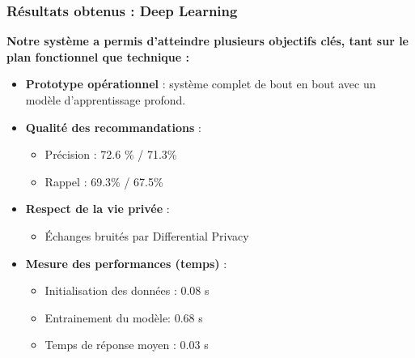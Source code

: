 \documentclass{beamer}
\begin{document}
\begin{frame}
    \frametitle{Résultats obtenus : Deep Learning}
    \scriptsize
    \textbf{Notre système a permis d’atteindre plusieurs objectifs clés, tant sur le plan fonctionnel que technique :}

    \vspace{0.3cm}
    \begin{itemize}
        \item \textbf{Prototype opérationnel} : système complet de bout en bout avec un modèle d’apprentissage profond.
        \item \textbf{Qualité des recommandations} :
              \begin{itemize}
                  \item Précision : 72.6 \% / 71.3\%
                  \item Rappel : 69.3\% / 67.5\%
              \end{itemize}
        \item \textbf{Respect de la vie privée} :
              \begin{itemize}
                  \item Échanges bruités par Differential Privacy
              \end{itemize}
        \item \textbf{Mesure des performances (temps)} :
              \begin{itemize}
                  \item Initialisation des données : 0.08 s
                  \item Entrainement du modèle: 0.68 s
                  \item Temps de réponse moyen : 0.03 s
              \end{itemize}
    \end{itemize}
\end{frame}
\end{document}
